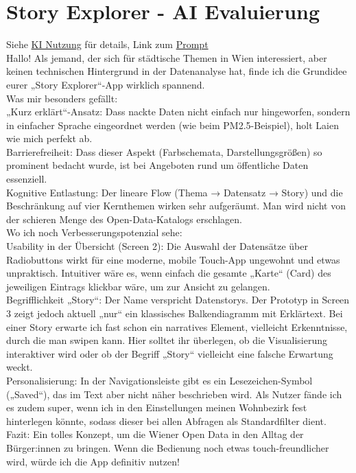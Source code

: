\section{Story Explorer - AI Evaluierung}
Siehe \href{sec:KI}{KI Nutzung} für details, Link zum \href{https://gemini.google.com/share/354e7d9f76b8}{Prompt}\\

\noindent
Hallo! Als jemand, der sich für städtische Themen in Wien interessiert, aber keinen technischen Hintergrund in der Datenanalyse hat, finde ich die Grundidee eurer „Story Explorer“-App wirklich spannend.
\\

\noindent
Was mir besonders gefällt:
\\

\noindent
    „Kurz erklärt“-Ansatz: Dass nackte Daten nicht einfach nur hingeworfen, sondern in einfacher Sprache eingeordnet werden (wie beim PM2.5-Beispiel), holt Laien wie mich perfekt ab.
\\

\noindent
    Barrierefreiheit: Dass dieser Aspekt (Farbschemata, Darstellungsgrößen) so prominent bedacht wurde, ist bei Angeboten rund um öffentliche Daten essenziell.
\\

\noindent
    Kognitive Entlastung: Der lineare Flow (Thema → Datensatz → Story) und die Beschränkung auf vier Kernthemen wirken sehr aufgeräumt. Man wird nicht von der schieren Menge des Open-Data-Katalogs erschlagen.
\\

\noindent
Wo ich noch Verbesserungspotenzial sehe:
\\

\noindent
    Usability in der Übersicht (Screen 2): Die Auswahl der Datensätze über Radiobuttons wirkt für eine moderne, mobile Touch-App ungewohnt und etwas unpraktisch. Intuitiver wäre es, wenn einfach die gesamte „Karte“ (Card) des jeweiligen Eintrags klickbar wäre, um zur Ansicht zu gelangen.
\\

\noindent
    Begrifflichkeit „Story“: Der Name verspricht Datenstorys. Der Prototyp in Screen 3 zeigt jedoch aktuell „nur“ ein klassisches Balkendiagramm mit Erklärtext. Bei einer Story erwarte ich fast schon ein narratives Element, vielleicht Erkenntnisse, durch die man swipen kann. Hier solltet ihr überlegen, ob die Visualisierung interaktiver wird oder ob der Begriff „Story“ vielleicht eine falsche Erwartung weckt.
\\

\noindent
    Personalisierung: In der Navigationsleiste gibt es ein Lesezeichen-Symbol („Saved“), das im Text aber nicht näher beschrieben wird. Als Nutzer fände ich es zudem super, wenn ich in den Einstellungen meinen Wohnbezirk fest hinterlegen könnte, sodass dieser bei allen Abfragen als Standardfilter dient.
\\

\noindent
Fazit:
Ein tolles Konzept, um die Wiener Open Data in den Alltag der Bürger:innen zu bringen. Wenn die Bedienung noch etwas touch-freundlicher wird, würde ich die App definitiv nutzen!